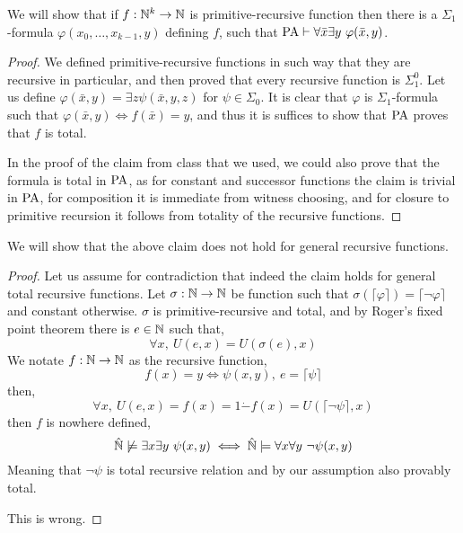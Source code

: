 \question{}
\subquestion{}
We will show that if $f : \mathbb{N}^k \to \mathbb{N}$ is primitive-recursive function then there is a $\Sigma_1$-formula $\varphi(x_0, \ldots, x_{k - 1}, y)$ defining $f$,
such that $\operatorname{PA} \vdash \forall \bar{x} \exists y\ \varphi(\bar{x}, y)$.
\begin{proof}
	We defined primitive-recursive functions in such way that they are recursive in particular, and then proved that every recursive function is $\Sigma_1^0$.
	Let us define $\varphi(\bar{x}, y) = \exists z \psi(\bar{x}, y, z)$ for $\psi \in \Sigma_0$.
	It is clear that $\varphi$ is $\Sigma_1$-formula such that $\varphi(\bar{x}, y) \iff f(\bar{x}) = y$, and thus it is suffices to show that $\operatorname{PA}$ proves that $f$ is total.

	In the proof of the claim from class that we used, we could also prove that the formula is total in $\operatorname{PA}$,
	as for constant and successor functions the claim is trivial in $\operatorname{PA}$, for composition it is immediate from witness choosing, and for closure to primitive recursion it follows from totality of the recursive functions.
\end{proof}

\subquestion{}
We will show that the above claim does not hold for general recursive functions.
\begin{proof}
	Let us assume for contradiction that indeed the claim holds for general total recursive functions.
	Let $\sigma : \mathbb{N} \to \mathbb{N}$ be function such that $\sigma(\lceil \varphi \rceil) = \lceil \lnot \varphi \rceil$ and constant otherwise.
	$\sigma$ is primitive-recursive and total, and by Roger's fixed point theorem there is $e \in \mathbb{N}$ such that,
	\[
		\forall x,\ U(e, x) = U(\sigma(e), x)
	\]
	We notate $f : \mathbb{N} \to \mathbb{N}$ as the recursive function,
	\[
		f(x) = y
		\iff \psi(x, y),\ e = \lceil \psi \rceil
	\]
	then,
	\[
		\forall x,\ 
		U(e, x)
		= f(x)
		= 1 \dot{-} f(x)
		= U(\lceil \lnot \psi \rceil, x)
	\]
	then $f$ is nowhere defined,
	\[
		\hat{\mathbb{N}}
		\not\models \exists x \exists y\ \psi(x, y)
		\iff \hat{\mathbb{N}}
		\models \forall x \forall y\ \lnot \psi(x, y)
	\]
	Meaning that $\lnot \psi$ is total recursive relation and by our assumption also provably total.

	This is wrong.
\end{proof}


